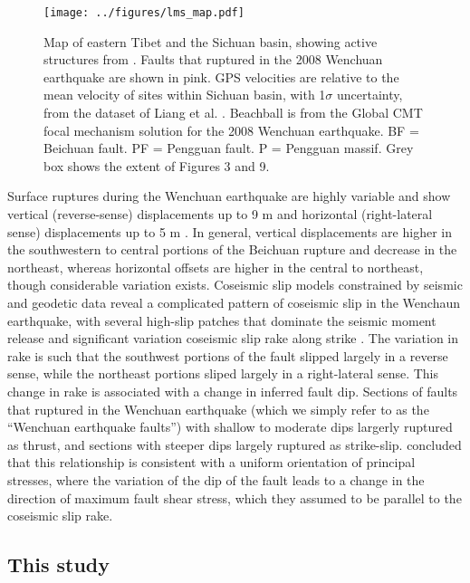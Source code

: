 \documentclass[twocolumn,jgrga]{AGUTeX}
\begin{document}
\begin{article}
\begin{figure}[ht!] \texttt{[image: ../figures/lms\_map.pdf]}
    \caption{Map of eastern Tibet and the Sichuan basin, showing active
        structures from \citet{styron2010}. Faults that ruptured in the 2008
        Wenchuan earthquake are shown in pink. GPS velocities are relative to
        the mean velocity of sites within Sichuan basin, with 1$\sigma$
        uncertainty, from the dataset of Liang et al.  \citet{liang2013}.
        Beachball is from the Global CMT focal mechanism solution for the 2008
    Wenchuan earthquake. BF = Beichuan fault. PF = Pengguan fault. P = Pengguan
massif. Grey box shows the extent of Figures 3 and 9.} \label{fig:lms_map}
\end{figure}

Surface ruptures during the Wenchuan earthquake are highly variable and show
vertical (reverse-sense) displacements up to 9 m and horizontal (right-lateral
sense) displacements up to 5 m \citep{lin2009, liu2009, xu2009}. In general,
vertical displacements are higher in the southwestern to central portions of
the Beichuan rupture and decrease in the northeast, whereas horizontal offsets
are higher in the central to northeast, though considerable variation exists.
Coseismic slip models constrained by seismic and geodetic data reveal a
complicated pattern of coseismic slip in the Wenchaun earthquake, with several
high-slip patches that dominate the seismic moment release and significant
variation coseismic slip rake along strike \citep[e.g.,][]{nakamura2010,
shen2009, tong2010, feng2010, zhang2011, qi2011, fielding2013}.  The variation
in rake is such that the southwest portions of the fault slipped largely in a
reverse sense, while the northeast portions sliped largely in a right-lateral
sense. This change in rake is associated with a change in inferred fault dip.
Sections of faults that ruptured in the Wenchuan earthquake (which we simply
refer to as the ``Wenchuan earthquake faults'') with shallow to moderate dips
largerly ruptured as thrust, and sections with steeper dips largely ruptured as
strike-slip.  \citet{medinaluna2013} concluded that this relationship is
consistent with a uniform orientation of principal stresses, where the
variation of the dip of the fault leads to a change in the direction of maximum
fault shear stress, which they assumed to be parallel to the coseismic slip
rake.

\subsection{This study}\label{this-study}


\end{article}
\end{document}

